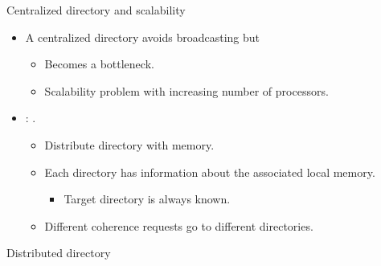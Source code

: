\begin{frame}[t]{Centralized directory and scalability}
\begin{itemize}
  \item A centralized directory avoids broadcasting but
    \begin{itemize}
      \item Becomes a bottleneck.
      \item Scalability problem with increasing number of processors.
    \end{itemize}

  \item {}: .
    \begin{itemize}
      \item Distribute directory with memory.
      \item Each directory has information about the associated local memory.
        \begin{itemize}
          \item Target directory is always known.
        \end{itemize}
      \item Different coherence requests go to different directories.
    \end{itemize}


\end{itemize}
\end{frame}

\begin{frame}{Distributed directory}
\makebox[\textwidth][c]{

}
\end{frame}
